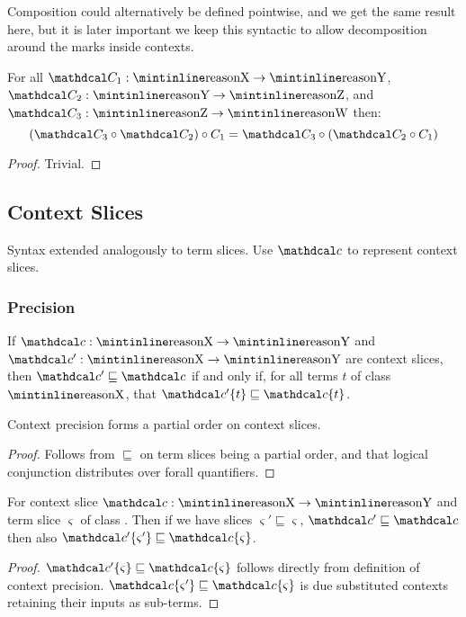 Composition could alternatively be defined pointwise, and we get the same result here, but it is later important we keep this syntactic to allow decomposition around the marks inside contexts.
\begin{proposition}
For all $\C_1 : \code{X} \to \code{Y}$, $\C_2 : \code{Y} \to \code{Z}$, and $\C_3 : \code{Z} \to \code{W}$ then:
\[(\C_3 \circ \C_2) \circ C_1 = \C_3 \circ (\C_2 \circ C_1)\]
\end{proposition}
\begin{proof}
Trivial.
\end{proof}

\subsection{Context Slices}
Syntax extended analogously to term slices. Use $\Cs$ to represent context slices.

\subsubsection{Precision}
\begin{definition}\label{def:ContextPrecisionAppendix}
If $\Cs : \code{X} \to \code{Y}$ and $\Cs' : \code{X} \to \code{Y}$ are context slices, then $\Cs' \sqsubseteq \Cs$ if and only if, for all terms $t$ of class $\code{X}$, that $\Cs'\{t\} \sqsubseteq \Cs\{t\}$.
\end{definition}
\begin{proposition}
Context precision forms a partial order on context slices.
\end{proposition}
\begin{proof}
Follows from $\sqsubseteq$ on term slices being a partial order, and that logical conjunction distributes over forall quantifiers.
\end{proof}
\begin{proposition}
For context slice $\Cs : \code{X} \to \code{Y}$ and term slice $\varsigma$ of class . Then if we have slices $\varsigma' \sqsubseteq \varsigma$, $\Cs' \sqsubseteq \Cs$ then also $\Cs'\{\varsigma'\} \sqsubseteq \Cs\{\varsigma\}$.
\end{proposition}
\begin{proof}
$\Cs'\{\varsigma\} \sqsubseteq \Cs\{\varsigma\}$ follows directly from definition of context precision. $\Cs\{\varsigma'\} \sqsubseteq \Cs\{\varsigma\}$ is due substituted contexts retaining their inputs as sub-terms.
\end{proof}
